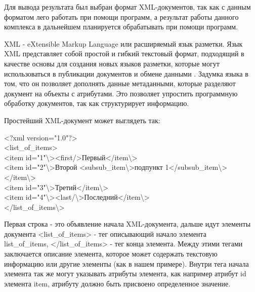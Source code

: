 Для вывода результата был выбран формат XML-документов, так как с данным форматом лего работать при помощи программ, а результат работы данного комплекса в дальнейшем планируется обрабатывать при помощи программ.

XML - eXtensible Markup Language или расширяемый язык разметки. Язык XML представляет собой простой и гибкий текстовый формат, подходящий в качестве основы для создания новых языков разметки, которые могут использоваться в публикации документов и обмене данными \cite{xml}. Задумка языка в том, что он позволяет дополнять данные метаданными, которые разделяют документ на объекты с атрибутами. Это позволяет упростить программную обработку документов, так как структурирует информацию.

Простейший XML-документ может выглядеть так:


\ttfamily
\noindent <?xml version="1.0"?> \\
<list\_of\_items> \\
<item id="1"\textbackslash><first/>Первый</item\textbackslash> \\
<item id="2"\textbackslash>Второй <subsub\_item\textbackslash>подпункт 1</subsub\_item\textbackslash></item\textbackslash> \\
<item id="3"\textbackslash>Третий</item\textbackslash> \\
<item id="4"\textbackslash><last/\textbackslash>Последний</item\textbackslash> \\
</list\_of\_items\textbackslash>
\normalfont


Первая строка - это объявление начала XML-документа, дальше идут элементы документа <list\_of\_items> - тег описывающий начало элемента \\list\_of\_items, </list\_of\_items> - тег конца элемента. Между этими тегами заключается описание элемента, которое может содержать текстовую информацию или другие элементы (как в нашем примере). Внутри тега начала элемента так же могут указывать атрибуты элемента, как например атрибут id элемента item, атрибуту должно быть присвоено определенное значение.
